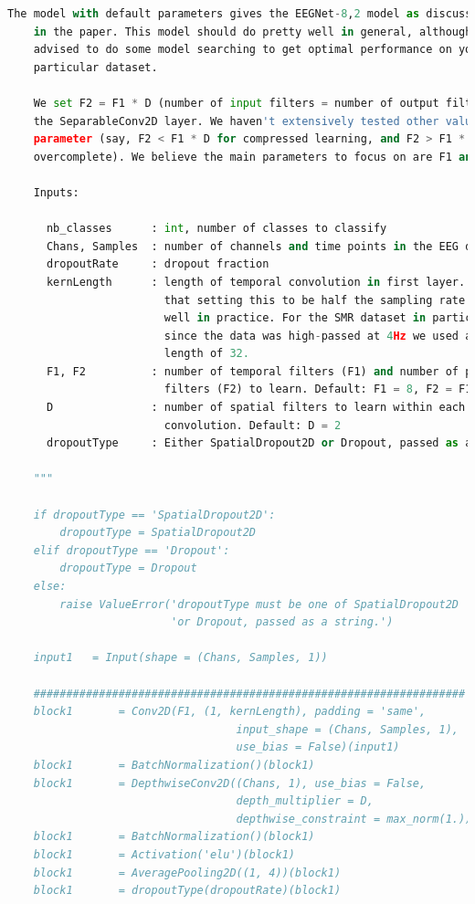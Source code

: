 \documentclass[conference]{IEEEtran}
\begin{document}
\begin{lstlisting}[language=Python, caption=Machine Learning Model, label=ml_model]
    The model with default parameters gives the EEGNet-8,2 model as discussed
    in the paper. This model should do pretty well in general, although it is
	advised to do some model searching to get optimal performance on your
	particular dataset.

    We set F2 = F1 * D (number of input filters = number of output filters) for
    the SeparableConv2D layer. We haven't extensively tested other values of this
    parameter (say, F2 < F1 * D for compressed learning, and F2 > F1 * D for
    overcomplete). We believe the main parameters to focus on are F1 and D. 

    Inputs:
        
      nb_classes      : int, number of classes to classify
      Chans, Samples  : number of channels and time points in the EEG data
      dropoutRate     : dropout fraction
      kernLength      : length of temporal convolution in first layer. We found
                        that setting this to be half the sampling rate worked
                        well in practice. For the SMR dataset in particular
                        since the data was high-passed at 4Hz we used a kernel
                        length of 32.     
      F1, F2          : number of temporal filters (F1) and number of pointwise
                        filters (F2) to learn. Default: F1 = 8, F2 = F1 * D. 
      D               : number of spatial filters to learn within each temporal
                        convolution. Default: D = 2
      dropoutType     : Either SpatialDropout2D or Dropout, passed as a string.

    """
    
    if dropoutType == 'SpatialDropout2D':
        dropoutType = SpatialDropout2D
    elif dropoutType == 'Dropout':
        dropoutType = Dropout
    else:
        raise ValueError('dropoutType must be one of SpatialDropout2D '
                         'or Dropout, passed as a string.')
    
    input1   = Input(shape = (Chans, Samples, 1))

    ##################################################################
    block1       = Conv2D(F1, (1, kernLength), padding = 'same',
                                   input_shape = (Chans, Samples, 1),
                                   use_bias = False)(input1)
    block1       = BatchNormalization()(block1)
    block1       = DepthwiseConv2D((Chans, 1), use_bias = False, 
                                   depth_multiplier = D,
                                   depthwise_constraint = max_norm(1.))(block1)
    block1       = BatchNormalization()(block1)
    block1       = Activation('elu')(block1)
    block1       = AveragePooling2D((1, 4))(block1)
    block1       = dropoutType(dropoutRate)(block1)
    

\end{lstlisting}
\end{document}
